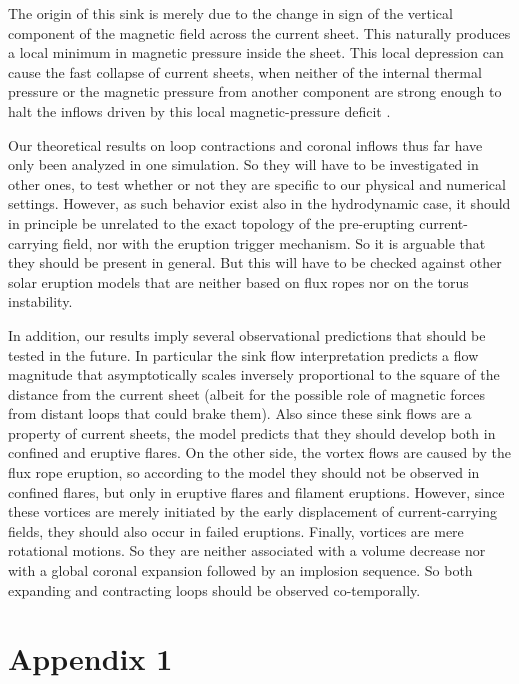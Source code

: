 \documentclass[apj]{emulateapj}
\begin{document}
The origin of this sink is merely due to the change in sign of the vertical 
component of the magnetic field across the current sheet. This naturally 
produces a local minimum in magnetic pressure inside the sheet. This local 
depression can cause the fast collapse of current sheets, when neither 
of  the internal thermal pressure or the magnetic pressure from another 
component are strong 
enough to halt the inflows  driven by this local magnetic-pressure deficit \citep{ForbesAlone1982}. 

Our theoretical results on loop contractions and coronal inflows 
thus far have only been analyzed in one simulation. So they will have 
to be investigated in other ones, to test whether or not they are  
specific to our physical and numerical settings. However, as such behavior exist also in the hydrodynamic case, 
it should in principle be unrelated to the exact topology of the pre-erupting 
current-carrying field, nor with the eruption trigger mechanism. 
So it is arguable that they should be present in general. But this 
will have to be checked against other solar eruption models that are 
neither based on flux ropes nor on the torus instability. 

In addition, our results imply several observational predictions that 
should be tested in the future. In particular the sink flow interpretation 
predicts a flow magnitude that asymptotically scales inversely proportional 
to the square of the distance from the current sheet (albeit for the 
possible role of magnetic forces from distant loops that could brake 
them). Also since these sink flows are a property of current sheets, the model 
predicts that they should develop both in confined and eruptive flares. On the other side, 
the vortex flows are caused by the flux rope eruption, so  according to the model they should 
not be observed in confined flares, but only in eruptive flares and filament 
eruptions. However, since these vortices are merely initiated by the early 
displacement of current-carrying fields, they should also occur in 
failed eruptions. Finally, vortices are mere rotational motions. So 
they are neither associated with a volume decrease nor with a global 
coronal expansion followed by an implosion sequence. So both expanding 
and contracting loops should be observed co-temporally. 

\section{Appendix 1}
\end{document}
